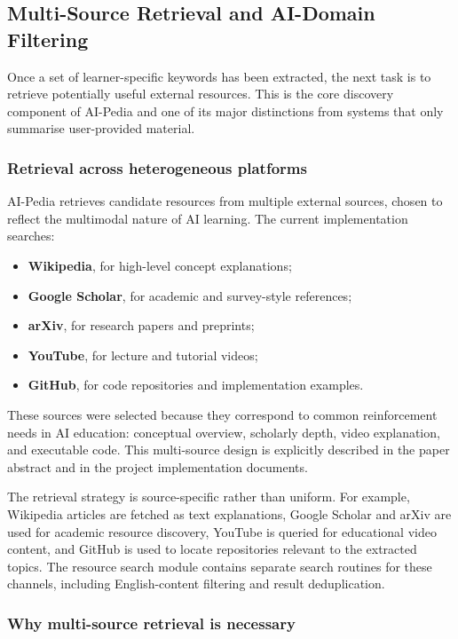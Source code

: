 \documentclass[10pt,journal,compsoc]{IEEEtran}
\begin{document}
\subsection{Multi-Source Retrieval and AI-Domain Filtering}

Once a set of learner-specific keywords has been extracted, the next task is to retrieve potentially useful external resources. This is the core discovery component of AI-Pedia and one of its major distinctions from systems that only summarise user-provided material.

\subsubsection{Retrieval across heterogeneous platforms}

AI-Pedia retrieves candidate resources from multiple external sources, chosen to reflect the multimodal nature of AI learning. The current implementation searches:

\begin{itemize}
\item \textbf{Wikipedia}, for high-level concept explanations;
\item \textbf{Google Scholar}, for academic and survey-style references;
\item \textbf{arXiv}, for research papers and preprints;
\item \textbf{YouTube}, for lecture and tutorial videos;
\item \textbf{GitHub}, for code repositories and implementation examples.
\end{itemize}

These sources were selected because they correspond to common reinforcement needs in AI education: conceptual overview, scholarly depth, video explanation, and executable code. This multi-source design is explicitly described in the paper abstract and in the project implementation documents.

The retrieval strategy is source-specific rather than uniform. For example, Wikipedia articles are fetched as text explanations, Google Scholar and arXiv are used for academic resource discovery, YouTube is queried for educational video content, and GitHub is used to locate repositories relevant to the extracted topics. The resource search module contains separate search routines for these channels, including English-content filtering and result deduplication.

\subsubsection{Why multi-source retrieval is necessary}
\end{document}
